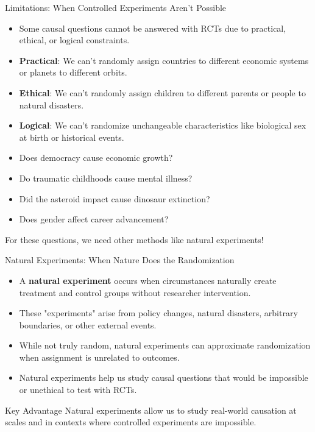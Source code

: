 \documentclass{beamer}
\begin{document}
	\begin{frame}{Limitations: When Controlled Experiments Aren't Possible}
		\begin{itemize}
			\item Some causal questions cannot be answered with RCTs due to practical, ethical, or logical constraints.
			\item \textbf{Practical}: We can't randomly assign countries to different economic systems or planets to different orbits.
			\item \textbf{Ethical}: We can't randomly assign children to different parents or people to natural disasters.
			\item \textbf{Logical}: We can't randomize unchangeable characteristics like biological sex at birth or historical events.
		\end{itemize}
		
		\begin{example}
			\begin{itemize}
				\item Does democracy cause economic growth?
				\item Do traumatic childhoods cause mental illness?
				\item Did the asteroid impact cause dinosaur extinction?
				\item Does gender affect career advancement?
			\end{itemize}
			For these questions, we need other methods like natural experiments!
		\end{example}
	\end{frame}
	
	\begin{frame}{Natural Experiments: When Nature Does the Randomization}
		\begin{itemize}
			\item A \textbf{natural experiment} occurs when circumstances naturally create treatment and control groups without researcher intervention.
			\item These "experiments" arise from policy changes, natural disasters, arbitrary boundaries, or other external events.
			\item While not truly random, natural experiments can approximate randomization when assignment is unrelated to outcomes.
			\item Natural experiments help us study causal questions that would be impossible or unethical to test with RCTs.
		\end{itemize}
		
		\begin{block}{Key Advantage}
			Natural experiments allow us to study real-world causation at scales and in contexts where controlled experiments are impossible.
		\end{block}
	\end{frame}
	
\end{document}
